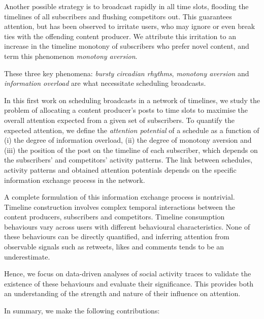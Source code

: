 \documentclass[onesided,letterpaper]{tufte-book}
\begin{document}
Another possible strategy is to broadcast rapidly in all time slots, flooding the timelines of all subscribers and flushing competitors out. This guarantees attention, but has been observed to irritate users, who may ignore\cite[-10pc]{counts2011taking}\cite[-7pc]{comarela2012understanding} or even break ties\cite[-4pc]{kwak2011fragile} with the offending content producer. We attribute this irritation to an increase in the timeline monotony of subscribers who prefer novel content, and term this phenomenon \textit{monotony aversion}.

These three key phenomena: \textit{bursty circadian rhythms}, \textit{monotony aversion} and \textit{information overload} are what necessitate scheduling broadcasts.

In this first work on scheduling broadcasts in a network of timelines, we study the problem of allocating a content producer's posts to time slots to maximise the overall attention expected from a given set of subscribers. To quantify the expected attention, we define the \textit{attention potential} of a schedule as a function of (i) the degree of information overload, (ii) the degree of monotony aversion and (iii) the position of the post on the timeline of each subscriber, which depends on the subscribers' and competitors' activity patterns. The link between schedules, activity patterns and obtained attention potentials depends on the specific information exchange process in the network.

A complete formulation of this information exchange process is nontrivial. Timeline construction involves complex temporal interactions between the content producers, subscribers and competitors. Timeline consumption behaviours vary across users with different behavioural characteristics. None of these behaviours can be directly quantified, and inferring attention from observable signals such as retweets, likes and comments tends to be an underestimate\cite{Bernstein:2013:QIA:2470654.2470658}.

Hence, we focus on data-driven analyses of social activity traces to validate the existence of these behaviours and evaluate their significance. This provides both an understanding of the strength and nature of their influence on attention.

In summary, we make the following contributions:
\end{document}
